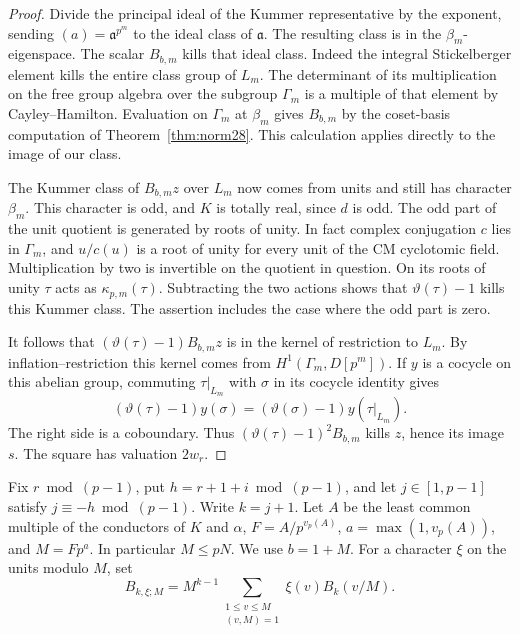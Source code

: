 \documentclass[a4paper,11pt]{article}
\theoremstyle{definition}
\theoremstyle{remark}
\numberwithin{equation}{section}
\begin{document}
\begin{proof}
Divide the principal ideal of the Kummer representative by
the exponent, sending \((a)=\mathfrak a^{p^m}\) to the ideal
class of \(\mathfrak a\). The resulting class is in the
\(\beta_m\)-eigenspace. The scalar \(B_{b,m}\) kills that
ideal class. Indeed the integral Stickelberger element kills
the entire class group of \(L_m\). The determinant of its
multiplication on the free group algebra over the subgroup
\(\Gamma_m\) is a multiple of that element by Cayley--Hamilton.
Evaluation on \(\Gamma_m\) at \(\beta_m\) gives \(B_{b,m}\)
by the coset-basis computation of Theorem~\ref{thm:norm28}.
This calculation applies directly to the image of our class.

The Kummer class of \(B_{b,m}z\) over \(L_m\) now comes from
units and still has character \(\beta_m\). This character is odd,
and \(K\) is totally real, since \(d\) is odd. The odd part of
the unit quotient is generated by roots of unity. In fact complex
conjugation \(c\) lies in \(\Gamma_m\), and \(u/c(u)\) is a root
of unity for every unit of the CM cyclotomic field. Multiplication
by two is invertible on the quotient in question. On its roots
of unity \(\tau\) acts as \(\kappa_{p,m}(\tau)\). Subtracting the
two actions shows that \(\vartheta(\tau)-1\) kills this Kummer
class. The assertion includes the case where the odd part is zero.

It follows that \((\vartheta(\tau)-1)B_{b,m}z\) is in the kernel of
restriction to \(L_m\). By inflation--restriction this kernel
comes from \(H^1(\Gamma_m,D[p^m])\). If \(y\) is a cocycle on
this abelian group, commuting \(\tau|_{L_m}\) with \(\sigma\)
in its cocycle identity gives
\[
   (\vartheta(\tau)-1)y(\sigma)
                  =(\vartheta(\sigma)-1)y(\tau|_{L_m}).
\]
The right side is a coboundary. Thus \((\vartheta(\tau)-1)^2B_{b,m}\)
kills \(z\), hence its image \(s\). The square has valuation \(2w_r\).
\end{proof}

Fix \(r\bmod(p-1)\), put \(h=r+1+i\bmod(p-1)\), and let
\(j\in[1,p-1]\) satisfy \(j\equiv-h\bmod(p-1)\). Write \(k=j+1\).
Let \(A\) be the least common multiple of the conductors of \(K\)
and \(\alpha\), \(F=A/p^{v_p(A)}\), \(a=\max(1,v_p(A))\), and
\(M=Fp^a\). In particular \(M\le pN\). We use \(b=1+M\).
For a character \(\xi\) on the units modulo \(M\), set
\[
 B_{k,\xi;M}=M^{k-1}\sum_{\substack{1\le v\le M\\(v,M)=1}}
                            \xi(v) B_k(v/M).
\]
\end{document}
